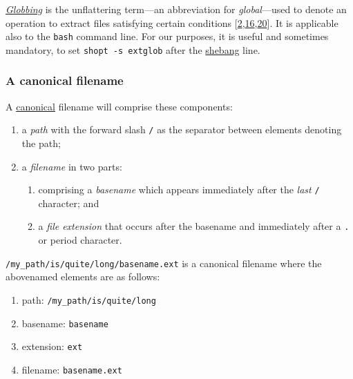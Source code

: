 \documentclass[
  a4paper,
]{article}
\providecommand{\tightlist}{%
  \setlength{\itemsep}{0pt}\setlength{\parskip}{0pt}}
\begin{document}
\href{https://en.wikipedia.org/w/index.php?title=Glob_(programming)\&oldid=1133836865}{\emph{Globbing}}
is the unflattering term---an abbreviation for \emph{global}---used to
denote an operation to extract files satisfying certain conditions
{[}\protect\hyperlink{ref-globhistory}{2},\protect\hyperlink{ref-globbingref}{16},\protect\hyperlink{ref-glob2023}{20}{]}.
It is applicable also to the \texttt{bash} command line. For our
purposes, it is useful and sometimes mandatory, to set
\texttt{shopt\ -s\ extglob} after the
\href{https://en.wikipedia.org/wiki/Shebang_(Unix)}{shebang} line.

\hypertarget{a-canonical-filename}{%
\subsubsection{A canonical filename}\label{a-canonical-filename}}

A \href{https://www.thefreedictionary.com/canonical}{canonical} filename
will comprise these components:

\begin{enumerate}
\tightlist
\item
  a \emph{path} with the forward slash \texttt{/} as the separator
  between elements denoting the path;
\item
  a \emph{filename} in two parts:

  \begin{enumerate}
  \def\labelenumii{(\alph{enumii})}
  \tightlist
  \item
    comprising a \emph{basename} which appears immediately after the
    \emph{last} \texttt{/} character; and
  \item
    a \emph{file extension} that occurs after the basename and
    immediately after a \texttt{.} or period character.
  \end{enumerate}
\end{enumerate}

\texttt{/my\_path/is/quite/long/basename.ext} is a canonical filename
where the abovenamed elements are as follows:

\begin{enumerate}
\tightlist
\item
  path: \texttt{/my\_path/is/quite/long}
\item
  basename: \texttt{basename}
\item
  extension: \texttt{ext}
\item
  filename: \texttt{basename.ext}
\end{enumerate}
\end{document}
